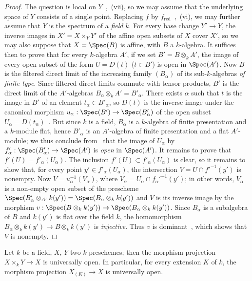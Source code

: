 \begin{proof}
The question is local on $Y$~,~(vii), so we may assume that the underlying space of $Y$ consists of a single point. Replacing $f$ by $f_{\mathrm{red}}$~,~(vi), we may further assume that $Y$ is the spectrum of a \emph{field} $k$. For every base change $Y'\to Y$, the inverse images in $X'=X\times_Y Y'$ of the affine open subsets of $X$ cover $X'$, so we may also suppose that $X=\Spec(B)$ is affine, with $B$ a $k$-algebra.
It suffices then to prove that for every $k$-algebra $A'$, if we set $B'=B\otimes_k A'$, the image of every open subset of the form $U=D(t)$ ($t\in B'$) is open in $\Spec(A')$.
Now $B$ is the filtered direct limit of the increasing family $(B_\alpha)$ of its sub-$k$-algebras \emph{of finite type}. Since filtered direct limits commute with tensor products, $B'$ is the direct limit of the $A'$-algebras $B_\alpha\otimes_k A'=B'_\alpha$.
There exists $\alpha$ such that $t$ is the image in $B'$ of an element $t_\alpha\in B'_\alpha$, so $D(t)$ is the inverse image under the canonical morphism $u_\alpha:\Spec(B')\to\Spec(B'_\alpha)$ of the open subset $U_\alpha=D(t_\alpha)$~.
But since $k$ is a field, $B_\alpha$ is a $k$-algebra of finite presentation and a $k$-module flat, hence $B'_\alpha$ is an $A'$-algebra of finite presentation and a flat $A'$-module; we thus conclude from~ that the image of $U_\alpha$ by $f'_\alpha:\Spec(B'_\alpha)\to\Spec(A')$ is \emph{open} in $\Spec(A')$.
It remains to prove that $f'(U)=f'_\alpha(U_\alpha)$. The inclusion $f'(U)\subset f'_\alpha(U_\alpha)$ is clear, so it remains to show that, for every point $y'\in f'_\alpha(U_\alpha)$, the intersection $V=U\cap f'^{-1}(y')$ is nonempty.
Now $V=u_\alpha^{-1}(V_\alpha)$, where $V_\alpha=U_\alpha\cap f_\alpha'^{-1}(y')$; in other words, $V_\alpha$ is a non-empty open subset of the prescheme $\Spec(B'_\alpha\otimes_{A'}k(y'))=\Spec(B_\alpha\otimes_k k(y'))$ and $V$ is its inverse image by the morphism $v:\Spec(B\otimes_k k(y'))\to\Spec(B_\alpha\otimes_k k(y'))$.
Since $B_\alpha$ is a subalgebra of $B$ and $k(y')$ is flat over the field $k$, the homomorphism $B_\alpha\otimes_k k(y')\to B\otimes_k k(y')$ is \emph{injective}. Thus $v$ is dominant~, which shows that $V$ is nonempty.
\end{proof}


\begin{corollary}[2.4.10]
\label{IV.2.4.10}
Let $k$ be a field, $X$, $Y$ two $k$-preschemes; then the morphism projection $X\times_k Y\to X$ is universally open.
In particular, for every extension $K$ of $k$, the morphism projection $X_{(K)}\to X$ is universally open.
\end{corollary}

